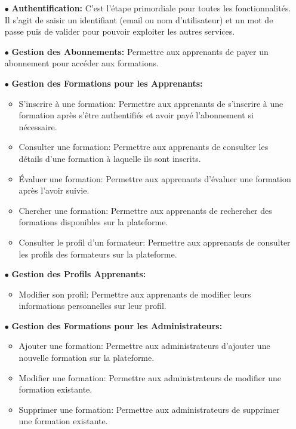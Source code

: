 \begin{itemize}
    \item[$\bullet$] \textbf{Authentification:} C’est l’étape primordiale pour toutes les fonctionnalités. Il s’agit de saisir un identifiant (email ou nom d'utilisateur) et un mot de passe puis de valider pour pouvoir exploiter les autres services.
    \item[$\bullet$] \textbf{Gestion des Abonnements:} Permettre aux apprenants de payer un abonnement pour accéder aux formations.
    \item[$\bullet$] \textbf{Gestion des Formations pour les Apprenants:}
    \begin{itemize}
        \item  S'inscrire à une formation: Permettre aux apprenants de s'inscrire à une formation après s'être authentifiés et avoir payé l'abonnement si nécessaire.
        \item  Consulter une formation: Permettre aux apprenants de consulter les détails d'une formation à laquelle ils sont inscrits.
        \item  Évaluer une formation: Permettre aux apprenants d'évaluer une formation après l'avoir suivie.
        \item  Chercher une formation: Permettre aux apprenants de rechercher des formations disponibles sur la plateforme.
        \item  Consulter le profil d'un formateur: Permettre aux apprenants de consulter les profils des formateurs sur la plateforme.
    \end{itemize}
    \item[$\bullet$] \textbf{Gestion des Profils Apprenants:}
    \begin{itemize}
        \item  Modifier son profil: Permettre aux apprenants de modifier leurs informations personnelles sur leur profil.
    \end{itemize}
    \item[$\bullet$] \textbf{Gestion des Formations pour les Administrateurs:}
    \begin{itemize}
        \item  Ajouter une formation: Permettre aux administrateurs d'ajouter une nouvelle formation sur la plateforme.
        \item  Modifier une formation: Permettre aux administrateurs de modifier une formation existante.
        \item  Supprimer une formation: Permettre aux administrateurs de supprimer une formation existante.

\end{itemize}
\end{itemize}
